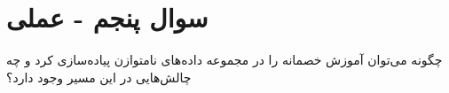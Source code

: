 \section{سوال پنجم - عملی}
چگونه می‌توان آموزش خصمانه را در مجموعه داده‌های نامتوازن پیاده‌سازی کرد و چه چالش‌هایی در این مسیر وجود دارد؟





\begin{qsolve}
	
\end{qsolve}